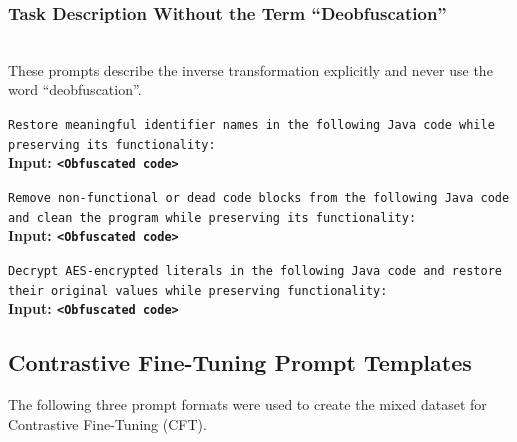 \subsubsection{Task Description Without the Term ``Deobfuscation''}~\\
These prompts describe the inverse transformation explicitly and never use
the word ``deobfuscation''.

\begin{tcolorbox}[colback=gray!5, colframe=gray!25, coltitle=black,
  title=Identifier Renaming (explicit reverse), boxrule=0.4pt, left=2pt,
  right=2pt, top=2pt, bottom=2pt, fontupper=\small]
\texttt{Restore meaningful identifier names in the following Java code while
preserving its functionality:}\\
\vspace{0.2cm}
\textbf{Input: \texttt{<Obfuscated code>}}
\end{tcolorbox}

\begin{tcolorbox}[colback=gray!5, colframe=gray!25, coltitle=black,
  title=Dead Code Insertion (explicit reverse), boxrule=0.4pt, left=2pt,
  right=2pt, top=2pt, bottom=2pt, fontupper=\small]
\texttt{Remove non-functional or dead code blocks from the following Java
code and clean the program while preserving its functionality:}\\
\vspace{0.2cm}
\textbf{Input: \texttt{<Obfuscated code>}}
\end{tcolorbox}

\begin{tcolorbox}[colback=gray!5, colframe=gray!25, coltitle=black,
  title=Literal Encryption (explicit reverse), boxrule=0.4pt, left=2pt,
  right=2pt, top=2pt, bottom=2pt, fontupper=\small]
\texttt{Decrypt AES-encrypted literals in the following Java code and restore
their original values while preserving functionality:}\\
\vspace{0.2cm}
\textbf{Input: \texttt{<Obfuscated code>}}
\end{tcolorbox}

\subsection{Contrastive Fine-Tuning Prompt Templates}
The following three prompt formats were used to create the mixed dataset for Contrastive Fine-Tuning (CFT).

